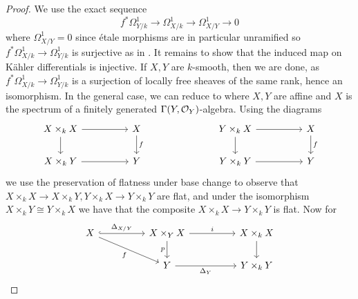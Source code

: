 \begin{proof}
    We use the exact sequence 
    $$f^{*}\Omega^{1}_{Y/k}\to\Omega^{1}_{X/k}\to\Omega^{1}_{X/Y}\to0$$
    where $\Omega^{1}_{X/Y}=0$ since \'{e}tale morphisms are in particular unramified so $f^{*}\Omega_{X/k}^{1}\to\Omega^{1}_{Y/k}$ is surjective as in . It remains to show that the induced map on K\"{a}hler differentials is injective. If $X,Y$ are $k$-smooth, then we are done, as $f^{*}\Omega_{X/k}^{1}\to\Omega^{1}_{Y/k}$ is a surjection of locally free sheaves of the same rank, hence an isomorphism. In the general case, we can reduce to where $X,Y$ are affine and $X$ is the spectrum of a finitely generated $\Gamma(Y,\Ocal_{Y})$-algebra. Using the diagrams 
    $$%
    \begin{tikzcd}
        {X\times_{k}X} && X &&& {Y\times_{k}X} && X \\
        {X\times_{k}Y} && Y &&& {Y\times_{k}Y} && Y
        \arrow[from=1-1, to=1-3]
        \arrow[from=1-1, to=2-1]
        \arrow["f", from=1-3, to=2-3]
        \arrow[from=1-6, to=1-8]
        \arrow[from=1-6, to=2-6]
        \arrow["f", from=1-8, to=2-8]
        \arrow[from=2-1, to=2-3]
        \arrow[from=2-6, to=2-8]
    \end{tikzcd}$$
    we use the preservation of flatness under base change to observe that $X\times_{k}X\to X\times_{k}Y,Y\times_{k}X\to Y\times_{k}Y$ are flat, and under the isomorphism $X\times_{k}Y\cong Y\times_{k}X$ we have that the composite $X\times_{k}X\to Y\times_{k}Y$ is flat. Now for 
    $$%
    \begin{tikzcd}
        X && {X\times_{Y}X} && {X\times_{k}X} \\
        && Y && {Y\times_{k}Y}
        \arrow["{\Delta_{X/Y}}", hook, from=1-1, to=1-3]
        \arrow["f"', from=1-1, to=2-3]
        \arrow["i", from=1-3, to=1-5]
        \arrow["p"', from=1-3, to=2-3]
        \arrow[from=1-5, to=2-5]
        \arrow["{\Delta_{Y}}"', from=2-3, to=2-5]

\end{tikzcd}$$
\end{proof}
